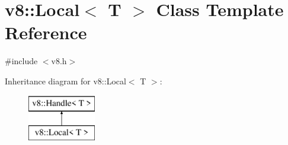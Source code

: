 \hypertarget{classv8_1_1_local}{}\section{v8\+:\+:Local$<$ T $>$ Class Template Reference}
\label{classv8_1_1_local}


{\ttfamily \#include $<$v8.\+h$>$}

Inheritance diagram for v8\+:\+:Local$<$ T $>$\+:\begin{figure}[H]
\begin{center}
\leavevmode
\includegraphics[height=2.000000cm]{classv8_1_1_local}
\end{center}
\end{figure}
